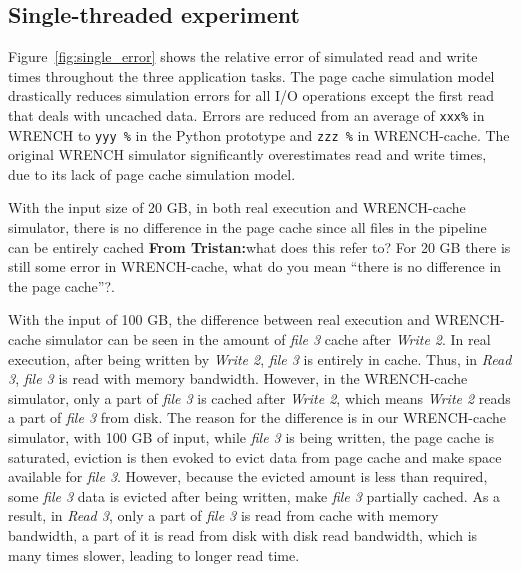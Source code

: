 \documentclass[conference]{IEEEtran}
\newcommand{\tristan}[1]{\color{orange}\textbf{From Tristan:}#1\color{black}}
\begin{document}
        \subsection{Single-threaded experiment}

        Figure~\ref{fig:single_error} shows the relative error of simulated
        read and write times throughout the three application tasks. The
        page cache simulation model drastically reduces simulation errors
        for all I/O operations except the first read that deals with
        uncached data. Errors are reduced from an average of \texttt{xxx\%}
        in WRENCH to \texttt{yyy \%} in the Python prototype and
        \texttt{zzz \%} in WRENCH-cache. The original WRENCH simulator significantly overestimates
        read and write times, due to its lack of page cache simulation
        model.

        With the input size of 20 GB, in both real execution and WRENCH-cache
        simulator, there is no difference in the page cache since all files in the
        pipeline can be entirely cached \tristan{what does this refer to? 
        For 20 GB there is still some error in WRENCH-cache, what do you mean ``there is no difference in the page cache''?}.

        With the input of 100 GB, the difference between real execution and WRENCH-cache
        simulator can be seen in the amount of \textit{file 3} cache after \textit{Write 2}.
        In real execution, after being written by \textit{Write 2},
        \textit{file 3} is entirely in cache.
        Thus, in \textit{Read 3}, \textit{file 3} is read with memory bandwidth.
        However, in the WRENCH-cache simulator, only a part of \textit{file 3} is
        cached after \textit{Write 2}, which means \textit{Write 2} reads a part of
        \textit{file 3} from disk.
        The reason for the difference is in our WRENCH-cache simulator,
        with 100 GB of input, while \textit{file 3} is being written,
        the page cache is saturated, eviction is then evoked to evict data
        from page cache and make space available for \textit{file 3}.
        However, because the evicted amount is less than required,
        some \textit{file 3} data is evicted after being written, make \textit{file 3}
        partially cached.
        As a result, in \textit{Read 3}, only a part of \textit{file 3} is read from cache
        with memory bandwidth, a part of it is read from disk with disk read bandwidth,
        which is many times slower, leading to longer read time.
\end{document}
